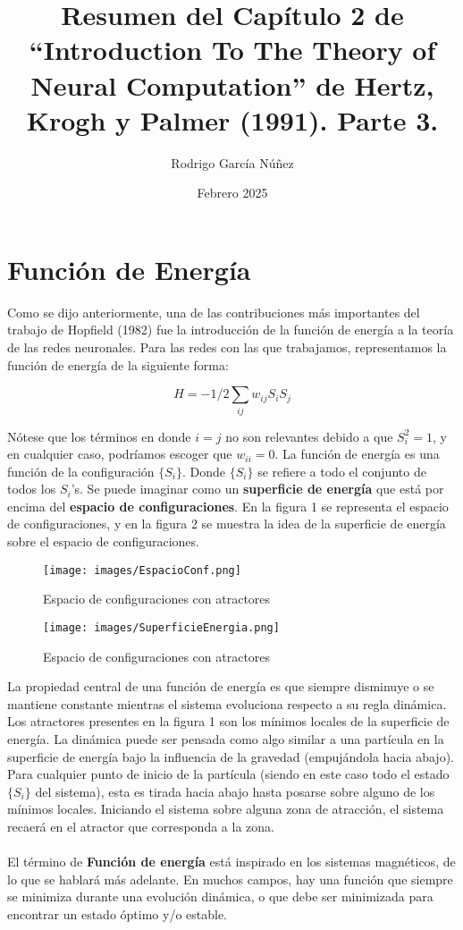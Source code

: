 \documentclass{article}
\title{Resumen del Capítulo 2 de “Introduction To The Theory of Neural Computation” de Hertz, Krogh y Palmer (1991). Parte 3.}
\author{Rodrigo García Núñez}
\affil{Universidad Autónoma Metropolitana }
\date{Febrero 2025}
\begin{document}
\maketitle

\section{Función de Energía}
Como se dijo anteriormente, una de las contribuciones más importantes del trabajo de Hopfield (1982) fue la introducción de la función de energía a la teoría de las redes neuronales. Para las redes con las que trabajamos, representamos la función de energía de la siguiente forma:

\begin{equation}
    H  = -1/2 \sum_{ij}w_{ij}S_iS_j
    \label{Función de energía}
\end{equation}

Nótese que los términos en donde $i=j$ no son relevantes debido a que $S_{i}^2 = 1$, y en cualquier caso, podríamos escoger que $w_{ii} = 0$.
La función de energía es una función de la configuración $\{S_i\}$. Donde $\{S_i\}$ se refiere a todo el conjunto de todos los $S_i$'s. Se puede imaginar como un \textbf{superficie de energía} que está por encima del \textbf{espacio de configuraciones}. En la figura 1 se representa el espacio de configuraciones, y en la figura 2 se muestra la idea de la superficie de energía sobre el espacio de configuraciones.
\\
\begin{figure}
    \centering
    \texttt{[image: images/EspacioConf.png]}
    \caption{Espacio de configuraciones con atractores}
    \label{Espacio de configuraciones con atractores.}
\end{figure}


\begin{figure}
    \centering
    \texttt{[image: images/SuperficieEnergia.png]}
    \caption{Espacio de configuraciones con atractores}
    \label{Superficie de Energía.}
\end{figure}

La propiedad central de una función de energía es que siempre disminuye o se mantiene constante mientras el sistema evoluciona respecto a su regla dinámica. Los atractores presentes en la figura 1 son los mínimos locales de la superficie de energía. La dinámica puede ser pensada como algo similar a una partícula en la superficie de energía bajo la influencia de la gravedad (empujándola hacia abajo). Para cualquier punto de inicio de la partícula (siendo en este caso todo el estado $\{S_i\}$ del sistema), esta es tirada hacia abajo hasta posarse sobre alguno de los mínimos locales. Iniciando el sistema sobre alguna zona de atracción, el sistema recaerá en el atractor que corresponda a la zona.
\\\\
El término de \textbf{Función de energía} está inspirado en los sistemas magnéticos, de lo que se hablará más adelante. En muchos campos, hay una función que siempre se minimiza durante una evolución dinámica, o que debe ser minimizada para encontrar un estado óptimo y/o estable.
\end{document}
